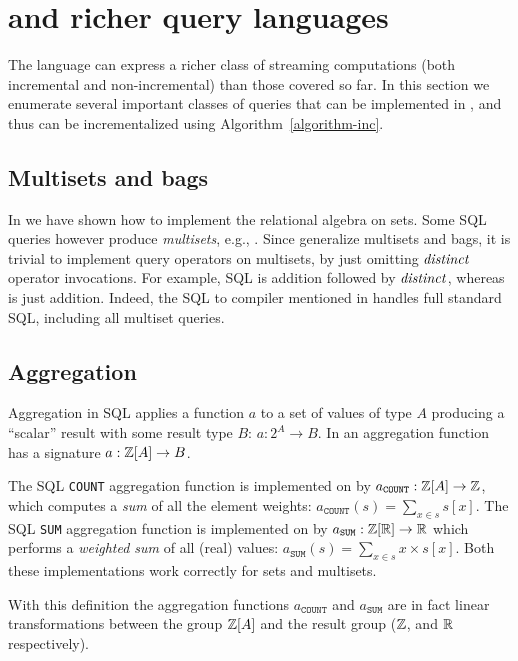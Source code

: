 \section{\dbsp and richer query languages}\label{sec:extensions}

The \dbsp language can express a richer class of streaming computations (both incremental and non-incremental)
than those covered so far. In this section we enumerate several important classes of
queries that can be implemented in \dbsp, and thus can be incrementalized using Algorithm~\ref{algorithm-inc}.

\subsection{Multisets and bags}

In  we have shown how to implement the relational algebra on sets.
Some SQL queries however produce \emph{multisets}, e.g., .
Since \zrs generalize multisets and bags, it is trivial to implement query
operators on multisets, by just omitting $\mathit{distinct}$ operator invocations.
For example, SQL  is \zr addition followed by $\mathit{distinct}$,
whereas  is just \zr addition.  Indeed, the SQL to \dbsp compiler
mentioned in  handles full standard SQL, including
all multiset queries.

\subsection{Aggregation}\label{sec:aggregation}

Aggregation in SQL applies a function $a$ to a set of values of type $A$ producing a ``scalar''
result with some result type $B$: $a: 2^A \to B$.  In \dbsp an aggregation function has
a signature $a: \mathbb{Z}[A] \to B$.

The SQL \texttt{COUNT} aggregation function is implemented on \zrs by $a_\texttt{COUNT} : \mathbb{Z}[A] \to \mathbb{Z}$, which
computes a \emph{sum} of all the element weights: $a_\texttt{COUNT}(s) = \sum_{x \in s} s[x]$.
The SQL \texttt{SUM} aggregation function is implemented on \zrs by $a_\texttt{SUM}: \mathbb{Z}[\mathbb{R}] \to \mathbb{R}$ which
performs a \emph{weighted sum} of all (real) values: $a_\texttt{SUM}(s) = \sum_{x \in s} x \times s[x]$.
Both these implementations work correctly for sets and multisets.

With this definition the aggregation functions $a_\texttt{COUNT}$ and $a_\texttt{SUM}$ are in
fact linear transformations between the group $\mathbb{Z}[A]$ and the result group ($\mathbb{Z}$, and $\mathbb{R}$ respectively).

